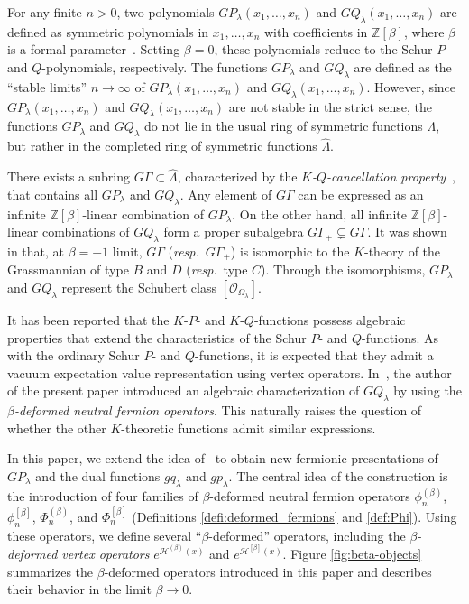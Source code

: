 \documentclass{amsart}
\def\ZZ{\mathord{\mathbb{Z}}}
\begin{document}
For any finite \( n > 0 \), two polynomials \( GP_\lambda(x_1, \dots, x_n) \) and \( GQ_\lambda(x_1, \dots, x_n) \) are defined as symmetric polynomials in \( x_1, \dots, x_n \) with coefficients in \( \mathbb{Z}[\beta] \), where \( \beta \) is a formal parameter~\cite[Definition 2.1]{IKEDA201322}.  
Setting \( \beta = 0 \), these polynomials reduce to the Schur \( P \)- and \( Q \)-polynomials, respectively.  
The functions \( GP_\lambda \) and \( GQ_\lambda \) are defined as the ``stable limits'' \( n \to \infty \) of \( GP_\lambda(x_1, \dots, x_n) \) and \( GQ_\lambda(x_1, \dots, x_n) \).  
However, since \( GP_\lambda(x_1, \dots, x_n) \) and \( GQ_\lambda(x_1, \dots, x_n) \) are not stable in the strict sense, the functions \( GP_\lambda \) and \( GQ_\lambda \) do not lie in the usual ring of symmetric functions \( \Lambda \), but rather in the completed ring of symmetric functions \( \widehat{\Lambda} \).


There exists a subring \( G\Gamma\subset \widehat{\Lambda} \), characterized by the \textit{$K$-$Q$-cancellation property}~\cite[Definition 1.1]{IKEDA201322}, that contains all $GP_\lambda$ and $GQ_\lambda$.
Any element of $G\Gamma$ can be expressed as an infinite $\ZZ[\beta]$-linear combination of $GP_\lambda$.
On the other hand, all infinite $\ZZ[\beta]$-linear combinations of $GQ_\lambda$ form a proper subalgebra $G\Gamma_{+}\subsetneq G\Gamma$.
It was shown in \cite{IKEDA201322} that,
at $\beta=-1$ limit,
$G\Gamma$ ({\textit{resp.}~$G\Gamma_{+}$}) is isomorphic to the $K$-theory of the Grassmannian of type $B$ and $D$ ({\textit{resp.}~type $C$}).
Through the isomorphisms, $GP_\lambda$ and $GQ_\lambda$ represent the Schubert class $[\mathcal{O}_{\Omega_\lambda}]$.

It has been reported that the $K$-$P$- and $K$-$Q$-functions possess algebraic properties that extend the characteristics of the Schur $P$- and $Q$-functions.
As with the ordinary Schur $P$- and $Q$-functions, it is expected that they admit a vacuum expectation value representation using vertex operators.
In~\cite{iwao2021neutralfermionic}, the author of the present paper introduced an algebraic characterization of $GQ_\lambda$ by using the \textit{$\beta$-deformed neutral fermion operators}.
This naturally raises the question of whether the other $K$-theoretic functions admit similar expressions.

In this paper, we extend the idea of~\cite{iwao2021neutralfermionic} to obtain new fermionic presentations of $GP_\lambda$ and the dual functions $gq_\lambda$ and $gp_\lambda$.
The central idea of the construction is the introduction of four families of $\beta$-deformed neutral fermion operators $\phi_n^{(\beta)}$, $\phi^{[\beta]}_n$, $\Phi_n^{(\beta)}$, and $\Phi^{[\beta]}_n$ (Definitions \ref{defi:deformed_fermions} and \ref{def:Phi}).
Using these operators, we define several ``$\beta$-deformed'' operators, including the \textit{$\beta$-deformed vertex operators} $e^{\mathcal{H}^{(\beta)}(x)}$ and $e^{\mathcal{H}^{[\beta]}(x)}$.
Figure \ref{fig:beta-objects} summarizes the $\beta$-deformed operators introduced in this paper and describes their behavior in the limit $\beta\to 0$.
\end{document}
